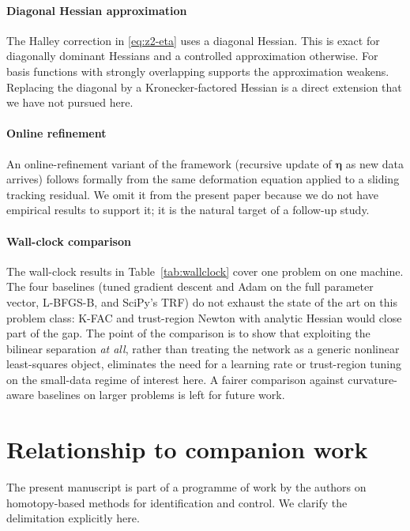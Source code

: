 \documentclass[preprint,12pt,numbers]{elsarticle}
\begin{document}
\paragraph{Diagonal Hessian approximation} The Halley correction in
\eqref{eq:z2-eta} uses a diagonal Hessian. This is exact for diagonally
dominant Hessians and a controlled approximation otherwise. For
basis functions with strongly overlapping supports the approximation
weakens. Replacing the diagonal by a Kronecker-factored Hessian
\cite{MartensGrosse2015} is a direct extension that we have not pursued
here.

\paragraph{Online refinement} An online-refinement variant of the
framework (recursive update of $\boldsymbol{\eta}$ as new data arrives)
follows formally from the same deformation equation applied to a sliding
tracking residual. We omit it from the present paper because we do not
have empirical results to support it; it is the natural target of a
follow-up study.

\paragraph{Wall-clock comparison} The wall-clock results in
Table~\ref{tab:wallclock} cover one problem on one machine. The four
baselines (tuned gradient descent and Adam on the full parameter vector,
L-BFGS-B, and SciPy's TRF) do not exhaust the state of the art on this
problem class: K-FAC and trust-region Newton with analytic Hessian would
close part of the gap. The point of the comparison is to show that
exploiting the bilinear separation \emph{at all}, rather than treating
the network as a generic nonlinear least-squares object, eliminates
the need for a learning rate or trust-region tuning on the small-data
regime of interest here. A fairer comparison against curvature-aware
baselines on larger problems is left for future work.


\section{Relationship to companion work}
\label{sec:companion}

The present manuscript is part of a programme of work by the authors on
homotopy-based methods for identification and control. We clarify the
delimitation explicitly here.
\end{document}
